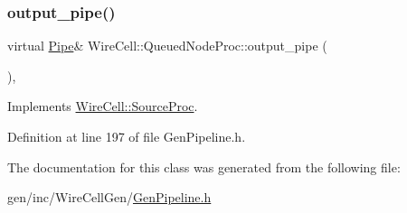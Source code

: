\subsubsection{\texorpdfstring{output\+\_\+pipe()}{output\_pipe()}}
{\footnotesize\ttfamily virtual \hyperlink{namespace_wire_cell_afce9bb01c731347c3d4c8ca9d4ed804f}{Pipe}\& Wire\+Cell\+::\+Queued\+Node\+Proc\+::output\+\_\+pipe (\begin{DoxyParamCaption}{ }\end{DoxyParamCaption})\hspace{0.3cm}{\ttfamily [inline]}, {\ttfamily [virtual]}}



Implements \hyperlink{class_wire_cell_1_1_source_proc_a480b8ba5e80e9e7c6ffdf0b5d9fd0578}{Wire\+Cell\+::\+Source\+Proc}.



Definition at line 197 of file Gen\+Pipeline.\+h.



The documentation for this class was generated from the following file\+:\begin{DoxyCompactItemize}
\item 
gen/inc/\+Wire\+Cell\+Gen/\hyperlink{_gen_pipeline_8h}{Gen\+Pipeline.\+h}\end{DoxyCompactItemize}
